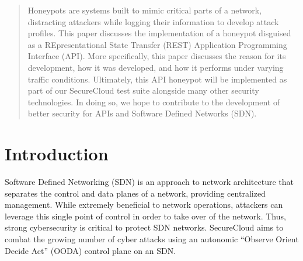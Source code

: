 \documentclass[10pt, conference]{IEEEtran}
\begin{document}
\maketitle


\begin{abstract}
Honeypots are systems built to mimic critical parts of a network, distracting attackers while logging their information to develop attack profiles. This paper discusses the implementation of a honeypot disguised as a REpresentational State Transfer (REST) Application Programming Interface (API). More specifically, this paper discusses the reason for its development, how it was developed, and how it performs under varying traffic conditions. Ultimately, this API honeypot will be implemented as part of our SecureCloud test suite alongside many other security technologies. In doing so, we hope to contribute to the development of better security for APIs and Software Defined Networks (SDN).
\end{abstract}







%
\IEEEpeerreviewmaketitle



\section{Introduction}
\label{intro}
Software Defined Networking (SDN) is an approach to network architecture that separates the control and data planes of a network, providing centralized management. While extremely beneficial to network operations, attackers can leverage this single point of control in order to take over of the network. Thus, strong cybersecurity is critical to protect SDN networks. SecureCloud aims to combat the growing number of cyber attacks using an autonomic “Observe Orient Decide Act” (OODA) control plane on an SDN.
\end{document}
